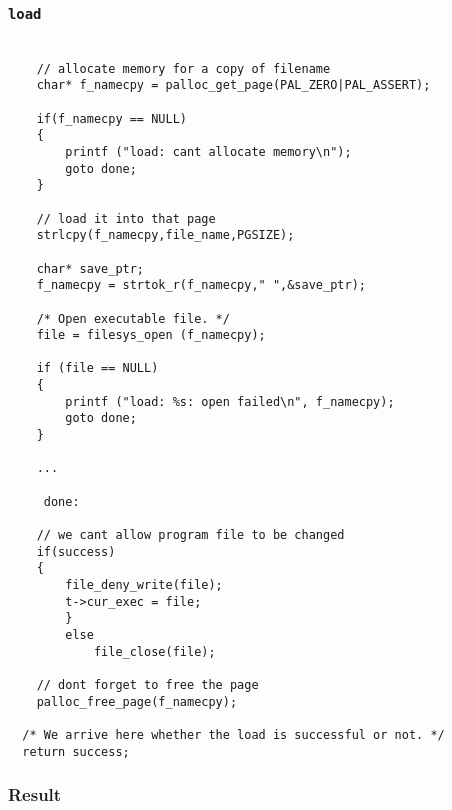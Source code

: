\documentclass[]{article}
\begin{document}
	\subsubsection{\texttt{load}}
	\paragraph{}
    \lstset{language=C, tabsize=2}    
    \begin{lstlisting}

	// allocate memory for a copy of filename
	char* f_namecpy = palloc_get_page(PAL_ZERO|PAL_ASSERT);
  
	if(f_namecpy == NULL)
	{
		printf ("load: cant allocate memory\n");
		goto done;
	}
	
	// load it into that page
	strlcpy(f_namecpy,file_name,PGSIZE);
	
	char* save_ptr;
	f_namecpy = strtok_r(f_namecpy," ",&save_ptr);

	/* Open executable file. */
	file = filesys_open (f_namecpy);

	if (file == NULL) 
	{
		printf ("load: %s: open failed\n", f_namecpy);
		goto done; 
	}
	
	...
	
	 done:
 
   	// we cant allow program file to be changed
   	if(success)
   	{
   		file_deny_write(file);
  		t->cur_exec = file;
 		}
 		else
 			file_close(file);

 	// dont forget to free the page
 	palloc_free_page(f_namecpy); 		
 		
  /* We arrive here whether the load is successful or not. */
  return success;
	\end{lstlisting}
	\subsubsection{Result}
\end{document}
